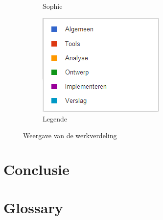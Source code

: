 \documentclass[i2]{oss}
\begin{document}
\begin{figure}[h!]
\begin{subfigure}[hb]{0.20\textwidth}
                \caption{Sophie}
        \end{subfigure}%
                \begin{subfigure}[hb]{0.20\textwidth}
                \centering
                \includegraphics[width=\textwidth]{legende}
                \caption{Legende}
        \end{subfigure}%


 \caption{Weergave van de werkverdeling}
\label{fig:werkverdeling}
\end{figure}





\section{Conclusie}
\label{ssec:Conclusie}



\section{Glossary}
\label{ssec:glossary}
\end{document}

